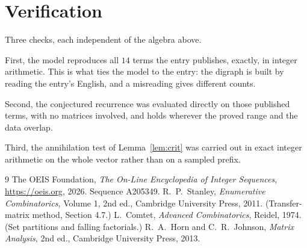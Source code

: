 \documentclass[11pt,a4paper]{article}
\theoremstyle{plain}
\theoremstyle{definition}
\begin{document}
\section{Verification}

Three checks, each independent of the algebra above.

First, the model reproduces all $14$ terms the entry publishes, exactly, in integer
arithmetic. This is what ties the model to the entry: the digraph is built by reading the
entry's English, and a misreading gives different counts.

Second, the conjectured recurrence was evaluated directly on those published terms, with no
matrices involved, and holds wherever the proved range and the data overlap.

Third, the annihilation test of Lemma~\ref{lem:crit} was carried out in exact integer
arithmetic on the whole vector rather than on a sampled prefix.

\begin{thebibliography}{9}
 The OEIS Foundation, \emph{The On-Line Encyclopedia of Integer
Sequences}, \url{https://oeis.org}, 2026. Sequence A205349.
 R.~P.~Stanley, \emph{Enumerative Combinatorics}, Volume 1, 2nd ed.,
Cambridge University Press, 2011. (Transfer-matrix method, Section 4.7.)
 L.~Comtet, \emph{Advanced Combinatorics}, Reidel, 1974. (Set partitions
and falling factorials.)
 R.~A.~Horn and C.~R.~Johnson, \emph{Matrix Analysis}, 2nd ed., Cambridge
University Press, 2013.
\end{thebibliography}
\end{document}
